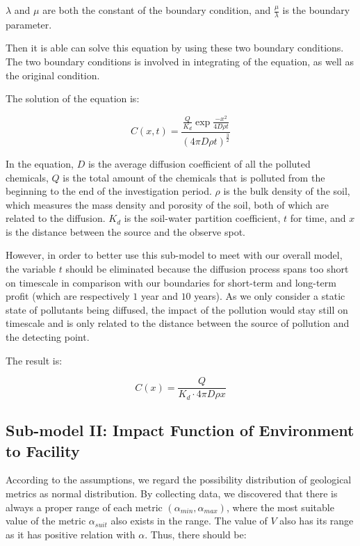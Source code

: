 \documentclass[./main.tex]{subfiles}
\begin{document}
        $\lambda$ and $\mu$ are both the constant of the boundary condition, and $\frac{\mu}{\lambda}$ is the boundary parameter.

        Then it is able can solve this equation by using these two boundary conditions.
        The two boundary conditions is involved in integrating of the equation, as well as the original condition.

        The solution of the equation is:

        \begin{equation}
            \label{eq:se}
            C\left(x, t\right) = \frac{\frac{Q}{K_d} \exp{\frac{-x^2}{4D\rho t}}}{\left(4\pi D\rho t\right)^{\frac{3}{2}}}
        \end{equation}

        In the equation, $D$ is the average diffusion coefficient of all the polluted chemicals, $Q$ is the total amount of the chemicals that is polluted from the beginning to the end of the investigation period.
        $\rho$ is the bulk density of the soil, which measures the mass density and porosity of the soil, both of which are related to the diffusion.
        $K_d$ is the soil-water partition coefficient, $t$ for time, and $x$ is the distance between the source and the observe spot.

        However, in order to better use this sub-model to meet with our overall model, the variable $t$ should be
        eliminated because the diffusion process spans too short on timescale in comparison with our boundaries for
short-term and long-term profit (which are respectively $1$ year and $10$ years).
        As we only consider a static state of pollutants being diffused, the impact of the pollution would stay still
on timescale and is only related to the distance between the source of pollution and the detecting point.

The result is:

        \begin{equation}
            \label{eq:nte}
            C\left(x\right) = \frac{Q}{K_d \cdot 4\pi D\rho x}
        \end{equation}

    \subsection{Sub-model II: Impact Function of Environment to Facility}
    According to the assumptions, we regard the possibility distribution of geological metrics as normal distribution.
    By collecting data, we discovered that there is always a proper range of each metric $\left( \alpha_{min}, \alpha_{
    max} \right)$, where the most suitable value of the metric $\alpha_{suit}$ also exists in the range.
    The value of $V$ also has its range as it has positive relation with $\alpha$.
    Thus, there should be:
\end{document}
